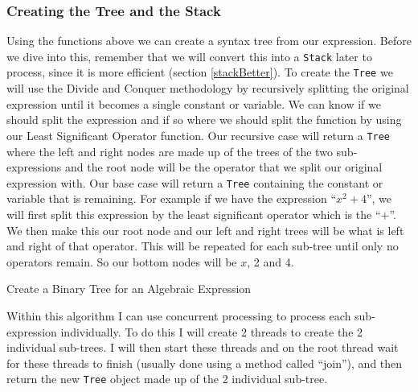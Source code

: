 \documentclass[../../../../../main.tex]{subfiles}
\begin{document}
\subsubsection{Creating the Tree and the Stack}
Using the functions above we can create a syntax tree from our expression. Before we dive into this, remember that we will convert this into a \texttt{Stack} later to process, since it is more efficient (section \ref{stackBetter}). To create the \texttt{Tree} we will use the Divide and Conquer methodology by recursively splitting the original expression until it becomes a single constant or variable. We can know if we should split the expression and if so where we should split the function by using our Least Significant Operator function. Our recursive case will return a \texttt{Tree} where the left and right nodes are made up of the trees of the two sub-expressions and the root node will be the operator that we split our original expression with. Our base case will return a \texttt{Tree} containing the constant or variable that is remaining. For example if we have the expression ``$x^2 + 4$'', we will first split this expression by the least significant operator which is the ``$+$''. We then make this our root node and our left and right trees will be what is left and right of that operator. This will be repeated for each sub-tree until only no operators remain. So our bottom nodes will be $x$, 2 and 4.

\begin{algorithm}[H]
\DontPrintSemicolon
\caption{Create a Binary Tree for an Algebraic Expression}
\label{alg:createTree1}
\end{algorithm}
Within this algorithm I can use concurrent processing to process each sub-expression individually. To do this I will create 2 threads to create the 2 individual sub-trees. I will then start these threads and on the root thread wait for these threads to finish (usually done using a method called ``join''), and then return the new \texttt{Tree} object made up of the 2 individual sub-tree.
\end{document}
